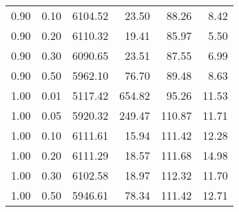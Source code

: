 \begin{table}
\begin{tabular}{rrrrrr}
0.90 & 0.10 & 6104.52 & 23.50 & 88.26 & 8.42 \\
0.90 & 0.20 & 6110.32 & 19.41 & 85.97 & 5.50 \\
0.90 & 0.30 & 6090.65 & 23.51 & 87.55 & 6.99 \\
0.90 & 0.50 & 5962.10 & 76.70 & 89.48 & 8.63 \\
1.00 & 0.01 & 5117.42 & 654.82 & 95.26 & 11.53 \\
1.00 & 0.05 & 5920.32 & 249.47 & 110.87 & 11.71 \\
1.00 & 0.10 & 6111.61 & 15.94 & 111.42 & 12.28 \\
1.00 & 0.20 & 6111.29 & 18.57 & 111.68 & 14.98 \\
1.00 & 0.30 & 6102.58 & 18.97 & 112.32 & 11.70 \\
1.00 & 0.50 & 5946.61 & 78.34 & 111.42 & 12.71 \\
\bottomrule
\end{tabular}
\end{table}
